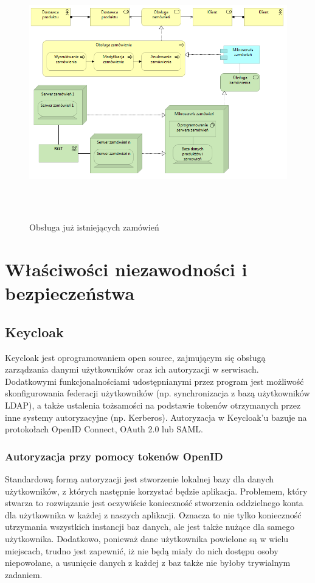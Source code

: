 \documentclass[11pt,a4paper,twoside]{article}
\begin{document}
\begin{figure}[ht]
\caption{Obsługa już istniejących zamówień}
\label{obslugaZamowienia04}
\centering
\includegraphics[height=11cm, width=15.7cm]{04_zamowienie_obsluga}
\end{figure}

\clearpage
\section{Właściwości niezawodności i bezpieczeństwa}
\subsection{Keycloak}
Keycloak jest oprogramowaniem open source, zajmującym się obsługą zarządzania danymi użytkowników oraz ich autoryzacji w serwisach. Dodatkowymi funkcjonalnościami udostępnianymi przez program jest możliwość skonfigurowania federacji użytkowników (np. synchronizacja z bazą użytkowników LDAP), a także ustalenia tożsamości na podstawie tokenów otrzymanych przez inne systemy autoryzacyjne (np. Kerberos). Autoryzacja w Keycloak'u bazuje na protokołach OpenID Connect, OAuth 2.0 lub SAML. 

\subsubsection{Autoryzacja przy pomocy tokenów OpenID}

Standardową formą autoryzacji jest stworzenie lokalnej bazy dla danych użytkowników, z których następnie korzystać będzie aplikacja. Problemem, który stwarza to rozwiązanie jest oczywiście konieczność stworzenia oddzielnego konta dla użytkownika w każdej z naszych aplikacji. Oznacza to nie tylko konieczność utrzymania wszystkich instancji baz danych, ale jest także nużące dla samego użytkownika. Dodatkowo, ponieważ dane użytkownika powielone są w wielu miejscach, trudno jest zapewnić, iż nie będą miały do nich dostępu osoby niepowołane, a usunięcie danych z każdej z baz także nie byłoby trywialnym zadaniem.
\end{document}
